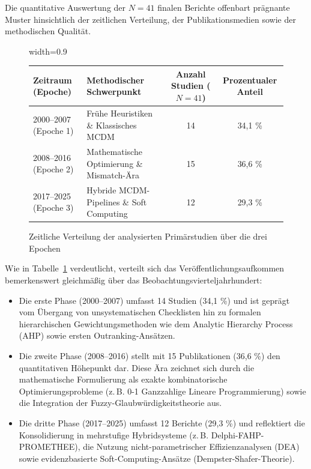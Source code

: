 Die quantitative Auswertung der $N = 41$ finalen Berichte offenbart prägnante Muster hinsichtlich der zeitlichen Verteilung, der Publikationsmedien sowie der methodischen Qualität.

\begin{figure}[htbp]
\centering
\begin{adjustbox}{width=0.9\textwidth}
\begin{tabular}{llcc}
\toprule
\textbf{Zeitraum (Epoche)} & \textbf{Methodischer Schwerpunkt} & \textbf{Anzahl Studien ($N=41$)} & \textbf{Prozentualer Anteil} \\
\midrule
2000--2007 (Epoche 1) & Frühe Heuristiken \& Klassisches MCDM & 14 & 34,1 \% \\
2008--2016 (Epoche 2) & Mathematische Optimierung \& Mismatch-Ära & 15 & 36,6 \% \\
2017--2025 (Epoche 3) & Hybride MCDM-Pipelines \& Soft Computing & 12 & 29,3 \% \\
\bottomrule
\end{tabular}
\end{adjustbox}
\caption{Zeitliche Verteilung der analysierten Primärstudien über die drei Epochen}
\label{tab:epochen_verteilung}
\end{figure}

Wie in Tabelle~\ref{tab:epochen_verteilung} verdeutlicht, verteilt sich das Veröffentlichungsaufkommen bemerkenswert gleichmäßig über das Beobachtungsvierteljahrhundert:
\begin{itemize}
    \item Die erste Phase (2000--2007) umfasst 14 Studien (34,1 \%) und ist geprägt vom Übergang von unsystematischen Checklisten hin zu formalen hierarchischen Gewichtungsmethoden wie dem Analytic Hierarchy Process (AHP) sowie ersten Outranking-Ansätzen.
    \item Die zweite Phase (2008--2016) stellt mit 15 Publikationen (36,6 \%) den quantitativen Höhepunkt dar. Diese Ära zeichnet sich durch die mathematische Formulierung als exakte kombinatorische Optimierungsprobleme (z.\,B. 0-1 Ganzzahlige Lineare Programmierung) sowie die Integration der Fuzzy-Glaubwürdigkeitstheorie aus.
    \item Die dritte Phase (2017--2025) umfasst 12 Berichte (29,3 \%) und reflektiert die Konsolidierung in mehrstufige Hybridsysteme (z.\,B. Delphi-FAHP-PROMETHEE), die Nutzung nicht-parametrischer Effizienzanalysen (DEA) sowie evidenzbasierte Soft-Computing-Ansätze (Dempster-Shafer-Theorie).
\end{itemize}

